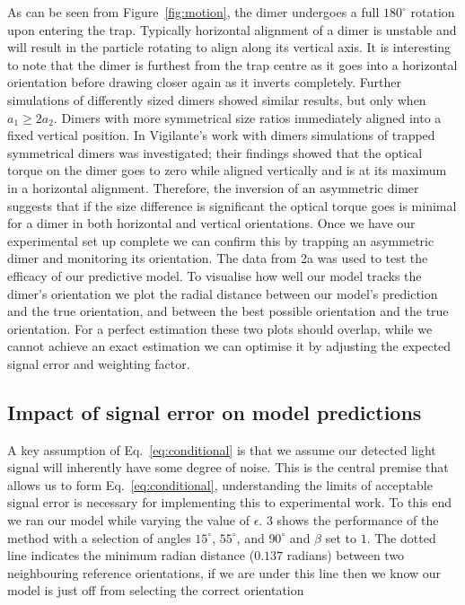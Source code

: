 \documentclass[final, 3p]{elsarticle}
\begin{document}
As can be seen from Figure~\ref{fig:motion}, the dimer undergoes a
full $180^{\circ}$ rotation upon entering the trap. Typically
horizontal alignment of a dimer is unstable and will result in the
particle rotating to align along its vertical axis. It is interesting
to note that the dimer is furthest from the trap centre as it goes
into a horizontal orientation before drawing closer again as it
inverts completely. Further simulations of differently sized dimers
showed similar results, but only when $a_1 \geq 2a_2$. Dimers with
more symmetrical size ratios immediately aligned into a fixed vertical
position.
%
In Vigilante's work with dimers \cite{Vigilante2020Brownian_OT}
simulations of trapped symmetrical dimers was investigated; their
findings showed that the optical torque on the dimer goes to zero
while aligned vertically and is at its maximum in a horizontal
alignment.  Therefore, the inversion of an asymmetric dimer suggests
that if the size difference is significant the optical torque goes is
minimal for a dimer in both horizontal and vertical orientations. Once
we have our experimental set up complete we can confirm this by
trapping an asymmetric dimer and monitoring its orientation. The data
from \figurename{ 2a} was used to test the efficacy of our predictive
model. To visualise how well our model tracks the dimer's orientation
we plot the radial distance between our model's prediction and the
true orientation, and between the best possible orientation and the
true orientation. For a perfect estimation these two plots should
overlap, while we cannot achieve an exact estimation we can optimise
it by adjusting the expected signal error and weighting factor.


\subsection{Impact of signal error on model predictions}
\label{sec:3.2}

A key assumption of Eq.~\eqref{eq:conditional} is that we assume our
detected light signal will inherently have some degree of noise. This
is the central premise that allows us to form
Eq.~\eqref{eq:conditional}, understanding the limits of acceptable
signal error is necessary for implementing this to experimental work.
To this end we ran our model while varying the value of $\epsilon$.
\figurename{ 3} shows the performance of the method with a selection
of angles $15^{\circ}$, $55^{\circ}$, and $90^{\circ}$ and $\beta$ set
to $1$.  The dotted line indicates the minimum radian distance
($0.137$ radians) between two neighbouring reference orientations, if
we are under this line then we know our model is just off from
selecting the correct orientation
\end{document}
